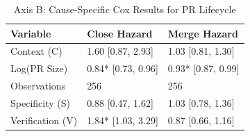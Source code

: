 \begin{table}
\caption{Axis B: Cause-Specific Cox Results for PR Lifecycle}
\label{tab:axisb}
\begin{tabular}{lll}
\toprule
Variable & Close Hazard & Merge Hazard \\
\midrule
Context (C) & 1.60 [0.87, 2.93] & 1.03 [0.81, 1.30] \\
Log(PR Size) & 0.84* [0.73, 0.96] & 0.93* [0.87, 0.99] \\
Observations & 256 & 256 \\
Specificity (S) & 0.88 [0.47, 1.62] & 1.03 [0.78, 1.36] \\
Verification (V) & 1.84* [1.03, 3.29] & 0.87 [0.66, 1.16] \\
\bottomrule
\end{tabular}
\end{table}
